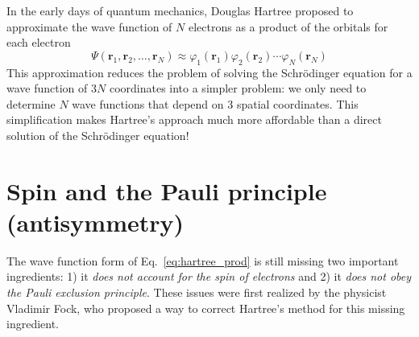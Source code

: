 \documentclass[../Main/notes.tex]{subfiles}
\begin{document}
In the early days of quantum mechanics, Douglas Hartree proposed to approximate the wave function of $N$ electrons as a product of the orbitals for each electron
\begin{equation}
\label{eq:hartree_prod}
\Psi(\mathbf{r}_1, \mathbf{r}_2, \ldots, \mathbf{r}_N) \approx \varphi_1(\mathbf{r}_1) \varphi_2(\mathbf{r}_2) \cdots \varphi_N(\mathbf{r}_N)
\end{equation}
This approximation reduces the problem of solving the Schr\"{o}dinger equation for a wave function of $3N$ coordinates into a simpler problem: we only need to determine $N$ wave functions that depend on 3 spatial coordinates.
This simplification makes Hartree's approach much more affordable than a direct solution of the Schr\"{o}dinger equation!

\section{Spin and the Pauli principle (antisymmetry)}
The wave function form of Eq.~\eqref{eq:hartree_prod} is still missing two important ingredients: 1) it \emph{does not account for the spin of electrons} and 2) it \emph{does not obey the Pauli exclusion principle}.
These issues were first realized by the physicist Vladimir Fock, who proposed a way to correct Hartree's method for this missing ingredient.
\end{document}
